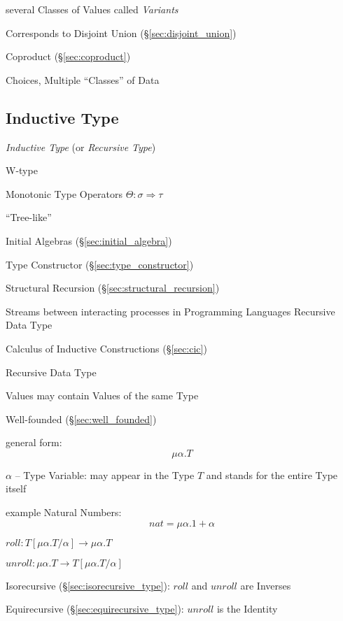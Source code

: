 several Classes of Values called \emph{Variants}

Corresponds to Disjoint Union (\S\ref{sec:disjoint_union})

Coproduct (\S\ref{sec:coproduct})

Choices, Multiple ``Classes'' of Data



\subsection{Inductive Type}\label{sec:inductive_type}

\emph{Inductive Type} (or \emph{Recursive Type})

W-type

Monotonic Type Operators $\Theta : \sigma \Rightarrow \tau$

``Tree-like''

Initial Algebras (\S\ref{sec:initial_algebra})

Type Constructor (\S\ref{sec:type_constructor})

Structural Recursion (\S\ref{sec:structural_recursion})

Streams between interacting processes in Programming Languages
Recursive Data Type

Calculus of Inductive Constructions (\S\ref{sec:cic})


\asterism

Recursive Data Type

Values may contain Values of the same Type

Well-founded (\S\ref{sec:well_founded})

general form:
\[
  \mu\alpha.T
\]

$\alpha$ -- Type Variable: may appear in the Type $T$ and stands for
the entire Type itself

example Natural Numbers:
\[
  nat = \mu\alpha.1 + \alpha
\]

$roll : T[\mu\alpha.T/\alpha] \rightarrow \mu\alpha.T$

$unroll : \mu\alpha.T \rightarrow T[\mu\alpha.T/\alpha]$

Isorecursive (\S\ref{sec:isorecursive_type}): $roll$ and $unroll$
are Inverses

Equirecursive (\S\ref{sec:equirecursive_type}): $unroll$ is the
Identity



